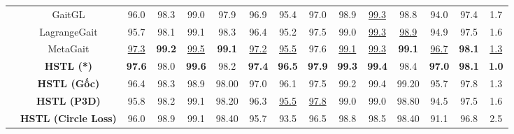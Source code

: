 \begin{table}[h]
{\begin{tabular}{c|c|ccccccccccc|c|c}
                                                       & GaitGL \cite{lin2021gait}                     & 96.0                     & 98.3                    & 99.0             & 97.9             & 96.9             & 95.4             & 97.0             & 98.9             & \underline{99.3} & 98.8             & 94.0             & 97.4             & 1.7             \\
                                                       & LagrangeGait \cite{chai2022lagrange}          & 95.7                     & 98.1                    & 99.1             & 98.3             & 96.4             & 95.2             & 97.5             & 99.0             & \underline{99.3} & \underline{98.9} & 94.9             & 97.5             & 1.6             \\
                                                       & MetaGait \cite{dou2022metagait}               & \underline{97.3}         & \textbf{99.2}           & \underline{99.5} & \textbf{99.1}    & \underline{97.2} & \underline{95.5} & 97.6             & \underline{99.1} & \underline{99.3} & \textbf{99.1}    & \underline{96.7} & \textbf{98.1}    & \underline{1.3} \\
            \cline{2-15}                               & \textbf{HSTL (*)}                             & \textbf{97.6}            & 98.0                    & \textbf{99.6}    & 98.2             & \textbf{97.4}    & \textbf{96.5}    & \textbf{97.9}    & \textbf{99.3}    & \textbf{99.4}    & 98.4             & \textbf{97.0}    & \textbf{98.1}    & \textbf{1.0}    \\
            \cline{2-15}                               & \textbf{HSTL (Gốc)}                           & 96.4                     & 98.3                    & 98.9             & 98.00            & 97.0             & 96.1             & 97.5             & 99.2             & 99.4             & 99.20            & 95.7             & 97.8             & 1.3             \\
            \cline{2-15}                               & \textbf{HSTL (P3D)}                           & 95.8                     & 98.2                    & 99.1             & 98.20            & 96.3             & \underline{95.5} & \underline{97.8} & 99.0             & 99.0             & 98.80            & 94.5             & 97.5             & 1.6             \\
                                                       & \textbf{HSTL (Circle Loss)}                   & 96.0                     & 98.9                    & 99.1             & 98.40            & 95.7             & 93.5             & 96.5             & 98.8             & 98.5             & 98.40            & 91.1             & 96.8             & 2.5             \\

\end{tabular}}
\end{table}
